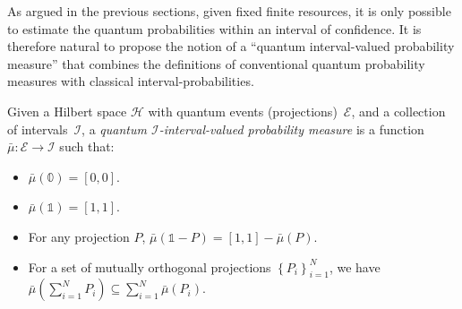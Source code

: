 \documentclass{article}
\theoremstyle{remark}
\newcommand{\Hilb}{\mathcal{H}}
\newcommand{\events}{\ensuremath{\mathcal{E}}}
\begin{document}
As argued in the previous sections, given fixed finite resources,
it is only possible to estimate the quantum probabilities within an
interval of confidence. It is therefore natural to propose the notion
of a ``quantum interval-valued probability measure'' that combines
the definitions of conventional quantum probability measures with
classical interval-probabilities.

\begin{definition}\label{def:QuantumInterval-valuedProbability}
Given a Hilbert space $\Hilb$ with quantum events (projections)~$\events$,
and a collection of intervals~$\mathscr{I}$, a \emph{quantum $\mathscr{I}$-interval-valued
probability measure} is a function~$\bar{\mu}:\events\rightarrow\mathscr{I}$
such that: 
\begin{itemize}
\item $\bar{\mu}(\mathbb{0})=\left[0,0\right]$. 
\item $\bar{\mu}(\mathbb{1})=\left[1,1\right]$. 
\item For any projection $P$, $\bar{\mu}\left(\mathbb{1}-P\right)=\left[1,1\right]-\bar{\mu}\left(P\right)$. 
\item For a set of mutually orthogonal projections $\left\{ P_{i}\right\} _{i=1}^{N}$,
we have $\bar{\mu}\left(\sum_{i=1}^{N}P_{i}\right)\subseteq\sum_{i=1}^{N}\bar{\mu}\left(P_{i}\right)$. 
\end{itemize}
\end{definition}
\end{document}

